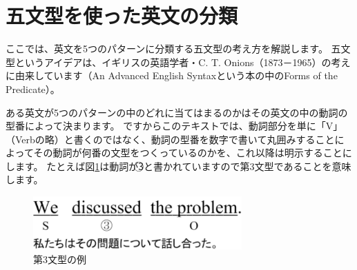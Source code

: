 \documentclass[12pt,titlepage]{jsarticle}
\def\maru#1{\textcircled{\scriptsize#1}}%
\begin{document}
  \section{五文型を使った英文の分類}
  ここでは、英文を5つのパターンに分類する五文型の考え方を解説します。
  五文型というアイデアは、イギリスの英語学者・C. T. Onions（1873－1965）の考えに由来しています（An Advanced English Syntaxという本の中のForms of the Predicate）。

  ある英文が5つのパターンの中のどれに当てはまるのかはその英文の中の動詞の型番によって決まります。
  ですからこのテキストでは、動詞部分を単に「V」（Verbの略）と書くのではなく、動詞の型番を数字で書いて丸囲みすることによってその動詞が何番の文型をつくっているのかを、これ以降は明示することにします。
たとえば図\ref{fig12}は動詞が\maru{3}と書かれていますので第3文型であることを意味します。
  \begin{figure}[htbp]
   \begin{center}
    \includegraphics[width=8cm]{./figure/fig12.pdf}
    \caption{第3文型の例}
    \label{fig12}
   \end{center}
  \end{figure}
\end{document}
